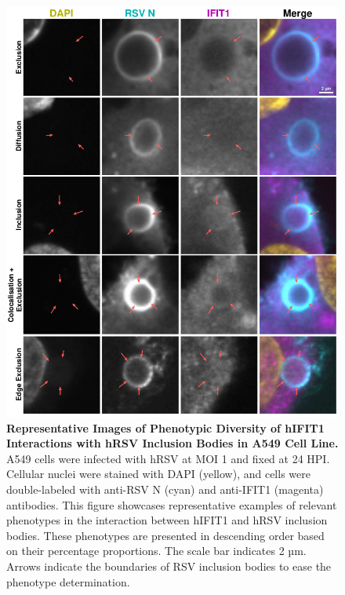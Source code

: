 \begin{figure}
    \centering
    \includegraphics[width=1\linewidth]{08. Chapter 3/Figs/02. Infection/01. IFIT1/03. a549 i1.pdf}
    \caption[Representative Images of Phenotypic Diversity of hIFIT1 Interactions with hRSV Inclusion Bodies in A549 Cell Line.]{\textbf{Representative Images of Phenotypic Diversity of hIFIT1 Interactions with hRSV Inclusion Bodies in A549 Cell Line.} A549 cells were infected with hRSV at MOI 1 and fixed at 24 HPI. Cellular nuclei were stained with DAPI (yellow), and cells were double-labeled with anti-RSV N (cyan) and anti-IFIT1 (magenta) antibodies. This figure showcases representative examples of relevant phenotypes in the interaction between hIFIT1 and hRSV inclusion bodies. These phenotypes are presented in descending order based on their percentage proportions. The scale bar indicates 2 µm. Arrows indicate the boundaries of RSV inclusion bodies to ease the phenotype determination.}
    \label{fig:Representative Images of Phenotypic Diversity of hIFIT1 Interactions with hRSV Inclusion Bodies in A549 Cell Line}
\end{figure}

